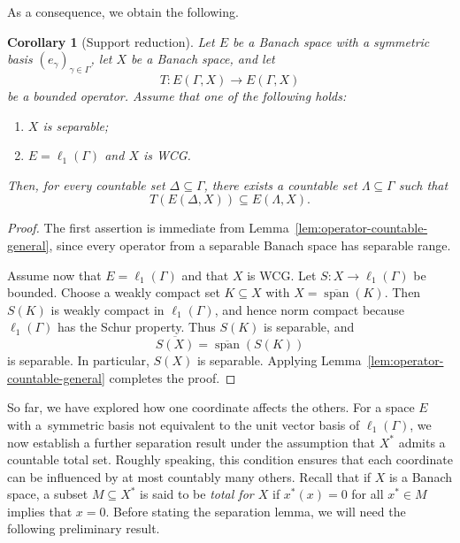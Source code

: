 \documentclass[11pt]{amsart}
\theoremstyle{plain}
\newtheorem{corollary}[theorem]{Corollary}
\theoremstyle{definition}
\numberwithin{equation}{section}
\newcommand{\spn}{\operatorname{span}}
\begin{document}
As a consequence, we obtain the following.

\begin{corollary}[Support reduction]\label{cor:operator-countable}
    Let $E$ be a Banach space with a symmetric basis $(e_\gamma)_{\gamma\in\Gamma}$, let $X$ be a Banach space, and let
    \begin{equation*}
        T \colon E(\Gamma,X)\to E(\Gamma,X)
    \end{equation*}
    be a bounded operator. Assume that one of the following holds:
    \begin{enumerate}
        \item $X$ is separable;
        \item $E=\ell_1(\Gamma)$ and $X$ is WCG.
    \end{enumerate}
    Then, for every countable set $\Delta\subseteq \Gamma$, there exists a countable set $\Lambda\subseteq \Gamma$ such that
    \begin{equation*}
        T(E(\Delta,X))\subseteq E(\Lambda,X).
    \end{equation*}
\end{corollary}

\begin{proof}
The first assertion is immediate from Lemma~\ref{lem:operator-countable-general},
since every operator from a separable Banach space has separable range.

Assume now that $E=\ell_1(\Gamma)$ and that $X$ is WCG.
Let $S\colon X\to \ell_1(\Gamma)$ be bounded.  Choose a weakly compact set $K\subseteq X$ with $X=\overline{\spn}(K)$.  Then $S(K)$ is weakly compact in $\ell_1(\Gamma)$, and hence norm compact because $\ell_1(\Gamma)$ has the Schur property.  Thus $S(K)$ is separable, and
\[
    \overline{S(X)}=\overline{\spn}(S(K))
\]
is separable.  In particular, $S(X)$ is separable.  Applying Lemma~\ref{lem:operator-countable-general} completes the proof.
\end{proof}



So far, we have explored how one coordinate affects the others. For a space $E$ with a~symmetric basis not equivalent to the unit vector basis of $\ell_1(\Gamma)$, we now establish a further separation result under the assumption that $X^*$ admits a countable total set. Roughly speaking, this condition ensures that each coordinate can be influenced by at most countably many others. Recall that if $X$ is a Banach space, a subset $M \subseteq X^*$ is said to be \emph{total for $X$} if $x^*(x) = 0$ for all $x^* \in M$ implies that $x = 0$. Before stating the separation lemma, we will need the following preliminary result.
\end{document}

